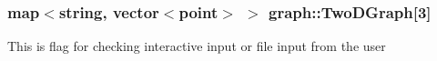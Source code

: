 \subsubsection[{\texorpdfstring{Two\+D\+Graph}{TwoDGraph}}]{\setlength{\rightskip}{0pt plus 5cm}map$<$string, vector$<${\bf point}$>$ $>$ graph\+::\+Two\+D\+Graph\mbox{[}3\mbox{]}}\hypertarget{namespacegraph_a18be037bbd2748e849072b9f5017c97e}{}\label{namespacegraph_a18be037bbd2748e849072b9f5017c97e}
This is flag for checking interactive input or file input from the user 
